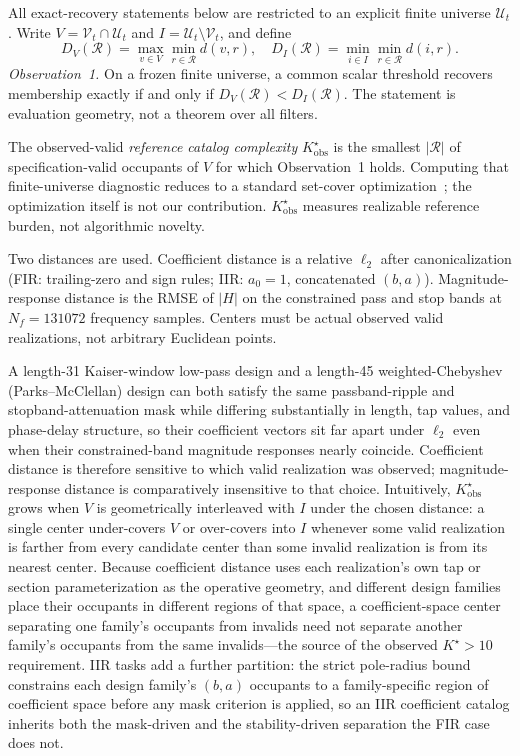 \documentclass{article}
\begin{document}
All exact-recovery statements below are restricted to an explicit
finite universe $\mathcal{U}_t$.
Write $V=\mathcal{V}_t\cap\mathcal{U}_t$ and
$I=\mathcal{U}_t\setminus\mathcal{V}_t$, and define
\begin{equation}
D_V(\mathcal{R})=\max_{v\in V}\min_{r\in\mathcal{R}}d(v,r),
\quad
D_I(\mathcal{R})=\min_{i\in I}\min_{r\in\mathcal{R}}d(i,r).
\label{eq:DVDI}
\end{equation}
\emph{Observation~1.}
On a frozen finite universe, a common scalar threshold recovers
membership exactly if and only if
$D_V(\mathcal{R})<D_I(\mathcal{R})$.
The statement is evaluation geometry, not a theorem over all
filters.

The observed-valid \emph{reference catalog complexity}
$K^\star_{\mathrm{obs}}$ is the smallest
$\lvert\mathcal{R}\rvert$ of specification-valid occupants of
$V$ for which Observation~1 holds.
Computing that finite-universe diagnostic reduces to a standard
set-cover
optimization~\cite{chvatal1979setcover,hart1968cnn}; the
optimization itself is not our contribution.
$K^\star_{\mathrm{obs}}$ measures realizable reference burden, not
algorithmic novelty.

Two distances are used.
Coefficient distance is a relative $\ell_2$ after
canonicalization (FIR: trailing-zero and sign rules; IIR:
$a_0=1$, concatenated $(b,a)$).
Magnitude-response distance is the RMSE of $\lvert H\rvert$ on the
constrained pass and stop bands at $N_f=131072$ frequency
samples.
Centers must be actual observed valid realizations, not arbitrary
Euclidean points.

A length-31 Kaiser-window low-pass design and a length-45
weighted-Chebyshev (Parks--McClellan) design can both satisfy the
same passband-ripple and stopband-attenuation mask while differing
substantially in length, tap values, and phase-delay structure, so
their coefficient vectors sit far apart under $\ell_2$ even when
their constrained-band magnitude responses nearly coincide.
Coefficient distance is therefore sensitive to which valid
realization was observed; magnitude-response distance is
comparatively insensitive to that choice.
Intuitively, $K^\star_{\mathrm{obs}}$ grows when $V$ is
geometrically interleaved with $I$ under the chosen distance: a
single center under-covers $V$ or over-covers into $I$ whenever
some valid realization is farther from every candidate center than
some invalid realization is from its nearest center.
Because coefficient distance uses each realization's own tap or
section parameterization as the operative geometry, and different
design families place their occupants in different regions of that
space, a coefficient-space center separating one family's occupants
from invalids need not separate another family's occupants from the
same invalids---the source of the observed $K^\star{>}10$
requirement.
IIR tasks add a further partition: the strict pole-radius bound
constrains each design family's $(b,a)$ occupants to a
family-specific region of coefficient space before any mask
criterion is applied, so an IIR coefficient catalog inherits both
the mask-driven and the stability-driven separation the FIR case
does not.
\end{document}
